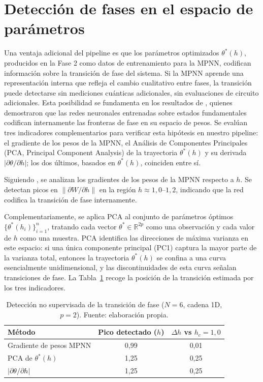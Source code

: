 \documentclass[11pt,a4paper,spanish]{book}
\begin{document}
\section{Detección de fases en el espacio de parámetros}
\label{sec:phase_detection}

Una ventaja adicional del pipeline es que los parámetros optimizados $\theta^*(h)$, producidos en la Fase 2 como datos de entrenamiento para la MPNN, codifican información sobre la transición de fase del sistema. Si la MPNN aprende una representación interna que refleja el cambio cualitativo entre fases, la transición puede detectarse sin mediciones cuánticas adicionales, sin evaluaciones de circuito adicionales. Esta posibilidad se fundamenta en los resultados de \citet{hernandes2025}, quienes demostraron que las redes neuronales entrenadas sobre estados fundamentales codifican internamente las fronteras de fase en su espacio de pesos. Se evalúan tres indicadores complementarios para verificar esta hipótesis en nuestro pipeline: el gradiente de los pesos de la MPNN, el Análisis de Componentes Principales (PCA, Principal Component Analysis) de la trayectoria $\theta^*(h)$ y su derivada $|\partial\theta/\partial h|$; los dos últimos, basados en $\theta^*(h)$, coinciden entre sí.

Siguiendo \citet{hernandes2025}, se analizan los gradientes de los pesos de la MPNN respecto a $h$. Se detectan picos en $\|\partial W / \partial h\|$ en la región $h \approx 1,0$--$1,2$, indicando que la red codifica la transición de fase internamente.

Complementariamente, se aplica PCA al conjunto de parámetros óptimos $\{\theta^*(h_i)\}_{i=1}^{n}$, tratando cada vector $\theta^* \in \mathbb{R}^{2p}$ como una observación y cada valor de $h$ como una muestra. PCA identifica las direcciones de máxima varianza en este espacio: si una única componente principal (PC1) captura la mayor parte de la varianza total, entonces la trayectoria $\theta^*(h)$ se confina a una curva esencialmente unidimensional, y las discontinuidades de esta curva señalan transiciones de fase. La Tabla~\ref{tab:unsupervised_detection} recoge la posición de la transición estimada por los tres indicadores.

\begin{table}[h]
\centering
\caption[Detección no supervisada de la transición de fase]{Detección no supervisada de la transición de fase ($N = 6$, cadena 1D, $p = 2$). Fuente: elaboración propia.}
\label{tab:unsupervised_detection}
\begin{tabular}{lcc}
\toprule
\textbf{Método} & \textbf{Pico detectado ($h$)} & \textbf{$\Delta h$ vs $h_c = 1,0$} \\
\midrule
Gradiente de pesos MPNN & 0,99 & 0,01 \\
PCA de $\theta^*(h)$ & 1,25 & 0,25 \\
$|\partial\theta/\partial h|$ & 1,25 & 0,25 \\
\bottomrule
\end{tabular}
\end{table}
\end{document}
